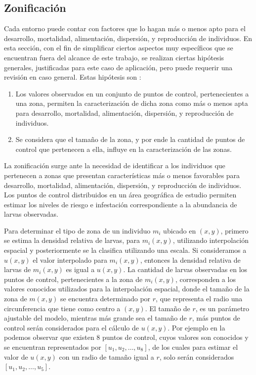 \subsection{Zonificación}
\label{subsec:cap4-zonificacion}
Cada entorno puede contar con factores que lo hagan más o menos apto para el desarrollo,
mortalidad, alimentación, dispersión, y reproducción de individuos. En esta sección, con el fin de
simplificar ciertos aspectos muy específicos que se encuentran fuera del alcance de este trabajo,
se realizan ciertas hipótesis generales, justificadas para este caso de aplicación, pero puede
requerir una revisión en caso general. Estas hipótesis son :
\begin{enumerate}
    \item Los valores observados en un conjunto de puntos de control, pertenecientes a una zona, permiten la caracterización de dicha zona como más o menos apta para desarrollo, mortalidad, alimentación, dispersión, y reproducción de individuos.
    \item Se considera que el tamaño de la zona, y por ende la cantidad de puntos de control que pertenecen a ella, influye en la caracterización de las zonas.
\end{enumerate}

La zonificación surge ante la necesidad de identificar a los individuos que pertenecen a zonas que
presentan características más o menos favorables para desarrollo, mortalidad, alimentación,
dispersión, y reproducción de individuos. Los puntos de control distribuidos en un área geográfica
de estudio permiten estimar los niveles de riesgo e infestación correspondiente a la abundancia de
larvas observadas.

Para determinar el tipo de zona de un individuo $m_{i}$ ubicado en $(x, y)$, primero se estima la
densidad relativa de larvas, para $m_{i}(x, y)$, utilizando interpolación espacial y posteriormente
se la clasifica utilizando una escala. Si consideramos a $u(x, y)$ el valor interpolado para
$m_{i}(x, y)$, entonces la densidad relativa de larvas de $m_{i}(x, y)$ es igual a $u(x, y)$. La
cantidad de larvas observadas en los puntos de control, pertenecientes a la zona de $m_{i}(x, y)$,
corresponden a los valores conocidos utilizados para la interpolación espacial, donde el tamaño de
la zona de $m(x, y)$ se encuentra determinado por $r$, que representa el radio una circunferencia
que tiene como centro a $(x, y)$. El tamaño de $r$, es un parámetro ajustable del modelo, mientras
más grande sea el tamaño de $r$, más puntos de control serán considerados para el cálculo de
$u(x, y)$. Por ejemplo en la  podemos observar que existen 8 puntos
de control, cuyos valores son conocidos y se encuentran representados por
$[u_{1}, u_{2}, \dots ,u_{8}]$, de los cuales para estimar el valor de $u(x, y)$ con un radio de
tamaño igual a $r$, solo serán considerados $[u_{1}, u_{2},\dots,u_{5}]$.

